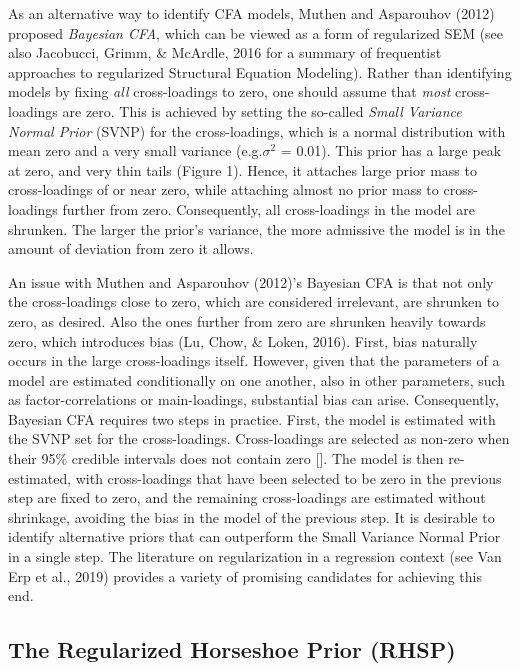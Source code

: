 \documentclass[
  man,floatsintext]{apa6}
\begin{document}
As an alternative way to identify CFA models, Muthen and Asparouhov (2012) proposed \emph{Bayesian CFA}, which can be viewed as a form of regularized SEM (see also Jacobucci, Grimm, \& McArdle, 2016 for a summary of frequentist approaches to regularized Structural Equation Modeling). Rather than identifying models by fixing \emph{all} cross-loadings to zero, one should assume that \emph{most} cross-loadings are zero. This is achieved by setting the so-called \emph{Small Variance Normal Prior} (SVNP) for the cross-loadings, which is a normal distribution with mean zero and a very small variance (e.g.\(\sigma^2\) = 0.01). This prior has a large peak at zero, and very thin tails (Figure 1). Hence, it attaches large prior mass to cross-loadings of or near zero, while attaching almost no prior mass to cross-loadings further from zero. Consequently, all cross-loadings in the model are shrunken. The larger the prior's variance, the more admissive the model is in the amount of deviation from zero it allows.

An issue with Muthen and Asparouhov (2012)'s Bayesian CFA is that not only the cross-loadings close to zero, which are considered irrelevant, are shrunken to zero, as desired. Also the ones further from zero are shrunken heavily towards zero, which introduces bias (Lu, Chow, \& Loken, 2016). First, bias naturally occurs in the large cross-loadings itself. However, given that the parameters of a model are estimated conditionally on one another, also in other parameters, such as factor-correlations or main-loadings, substantial bias can arise. Consequently, Bayesian CFA requires two steps in practice. First, the model is estimated with the SVNP set for the cross-loadings. Cross-loadings are selected as non-zero when their 95\% credible intervals does not contain zero {[}{]}. The model is then re-estimated, with cross-loadings that have been selected to be zero in the previous step are fixed to zero, and the remaining cross-loadings are estimated without shrinkage, avoiding the bias in the model of the previous step. It is desirable to identify alternative priors that can outperform the Small Variance Normal Prior in a single step. The literature on regularization in a regression context (see Van Erp et al., 2019) provides a variety of promising candidates for achieving this end.

\hypertarget{the-regularized-horseshoe-prior-rhsp}{%
\subsection{The Regularized Horseshoe Prior (RHSP)}\label{the-regularized-horseshoe-prior-rhsp}}
\end{document}
